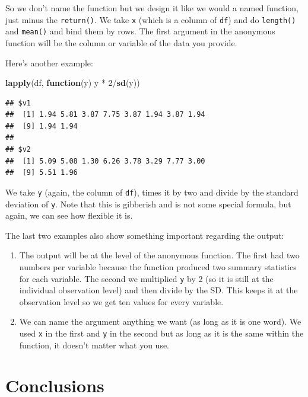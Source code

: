 \documentclass[]{tufte-book}
\newenvironment{Shaded}{}{}
\newcommand{\KeywordTok}[1]{\textcolor[rgb]{0.00,0.44,0.13}{\textbf{#1}}}
\newcommand{\DecValTok}[1]{\textcolor[rgb]{0.25,0.63,0.44}{#1}}
\newcommand{\StringTok}[1]{\textcolor[rgb]{0.25,0.44,0.63}{#1}}
\newcommand{\ControlFlowTok}[1]{\textcolor[rgb]{0.00,0.44,0.13}{\textbf{#1}}}
\newcommand{\OperatorTok}[1]{\textcolor[rgb]{0.40,0.40,0.40}{#1}}
\newcommand{\NormalTok}[1]{#1}
\providecommand{\tightlist}{%
  \setlength{\itemsep}{0pt}\setlength{\parskip}{0pt}}
\theoremstyle{definition}
\theoremstyle{definition}
\theoremstyle{remark}
\begin{document}
So we don't name the function but we design it like we would a named
function, just minus the \texttt{return()}. We take \texttt{x} (which is
a column of \texttt{df}) and do \texttt{length()} and \texttt{mean()}
and bind them by rows. The first argument in the anonymous function will
be the column or variable of the data you provide.

Here's another example:

\begin{Shaded}
\begin{Highlighting}[]
\KeywordTok{lapply}\NormalTok{(df, }\ControlFlowTok{function}\NormalTok{(y) y }\OperatorTok{*}\StringTok{ }\DecValTok{2}\OperatorTok{/}\KeywordTok{sd}\NormalTok{(y))}
\end{Highlighting}
\end{Shaded}

\begin{verbatim}
## $v1
##  [1] 1.94 5.81 3.87 7.75 3.87 1.94 3.87 1.94
##  [9] 1.94 1.94
## 
## $v2
##  [1] 5.09 5.08 1.30 6.26 3.78 3.29 7.77 3.00
##  [9] 5.51 1.96
\end{verbatim}

We take \texttt{y} (again, the column of \texttt{df}), times it by two
and divide by the standard deviation of \texttt{y}. Note that this is
gibberish and is not some special formula, but again, we can see how
flexible it is.

The last two examples also show something important regarding the
output:

\begin{enumerate}
\def\labelenumi{\arabic{enumi}.}
\tightlist
\item
  The output will be at the level of the anonymous function. The first
  had two numbers per variable because the function produced two summary
  statistics for each variable. The second we multiplied \texttt{y} by 2
  (so it is still at the individual observation level) and then divide
  by the SD. This keeps it at the observation level so we get ten values
  for every variable.
\item
  We can name the argument anything we want (as long as it is one word).
  We used \texttt{x} in the first and \texttt{y} in the second but as
  long as it is the same within the function, it doesn't matter what you
  use.
\end{enumerate}

\section*{Conclusions}\label{conclusions-4}
\end{document}

